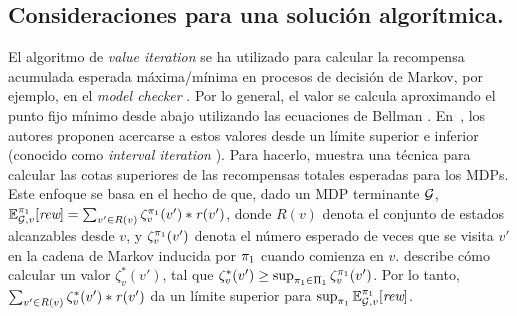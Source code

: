 \subsection{Consideraciones para una solución algorítmica.} 
El algoritmo de \emph{value iteration} \cite{Bellman57} se ha utilizado para calcular la recompensa acumulada esperada máxima/mínima en procesos de decisión de Markov, por ejemplo, en el \textit{model checker} {\Prism}. Por lo general, el valor se calcula aproximando el punto fijo mínimo desde abajo utilizando las ecuaciones de Bellman \cite{Bellman57}. En~\cite{DBLP:conf/cav/Baier0L0W17}, los autores proponen acercarse a estos valores desde un límite superior e inferior (conocido como \emph{interval iteration} \cite{DBLP:journals/tcs/HaddadM18}). Para hacerlo, \cite{DBLP:conf/cav/Baier0L0W17} muestra una técnica para calcular las cotas superiores de las recompensas totales esperadas para los MDPs. Este enfoque se basa en el hecho de que, dado un MDP terminante $\mathcal{G}$, $\mathbb{E}^{\pi_{1}}_{\mathcal{G},v}[\textit{rew}] = \sum_{v' \in R(v)} \zeta_v^{\pi_{1}}(v')*\mathit{r}(v')$, donde $R(v)$ denota el conjunto de estados alcanzables desde $v$, y $\zeta_v ^{\pi_{1}}(v')$ denota el número esperado de veces que se visita $v'$ en la cadena de Markov inducida por $\pi_{1}$ cuando comienza en $v$. \cite{DBLP:conf/cav/Baier0L0W17} describe cómo calcular un valor $\zeta_{v}^*(v')$, tal que $\zeta_v^*(v') \geq \sup_{\pi_{ 1} \in \Pi_{1}} \zeta_v^{\pi_{1}}(v')$. Por lo tanto, $\sum_{v' \in R(v)} \zeta_v^{*}(v')*\mathit{r}(v')$ da un límite superior para $\sup_{\pi_{1}} \mathbb{E}^{\pi_{1}}_{\mathcal{G},v}[\textit{rew}]$.

